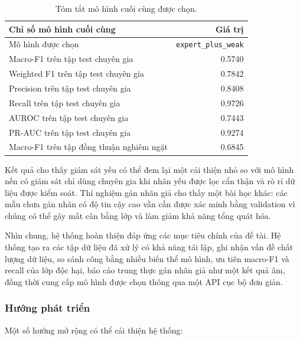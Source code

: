 \begin{table}[H]
\centering
\small
\renewcommand{\arraystretch}{1.25}
\begin{tabular}{|l|r|}
\hline
\textbf{Chỉ số mô hình cuối cùng} & \textbf{Giá trị} \\
\hline
Mô hình được chọn & \texttt{expert\_plus\_weak} \\
\hline
Macro-F1 trên tập test chuyên gia & 0.5740 \\
\hline
Weighted F1 trên tập test chuyên gia & 0.7842 \\
\hline
Precision trên tập test chuyên gia & 0.8408 \\
\hline
Recall trên tập test chuyên gia & 0.9726 \\
\hline
AUROC trên tập test chuyên gia & 0.7443 \\
\hline
PR-AUC trên tập test chuyên gia & 0.9274 \\
\hline
Macro-F1 trên tập đồng thuận nghiêm ngặt & 0.6845 \\
\hline
\end{tabular}
\caption{Tóm tắt mô hình cuối cùng được chọn.}
\label{tab:summary-final-model}
\end{table}

Kết quả cho thấy giám sát yếu có thể đem lại một cải thiện nhỏ so với mô hình nền có giám sát chỉ dùng chuyên gia khi nhãn yếu được lọc cẩn thận và rò rỉ dữ liệu được kiểm soát. Thí nghiệm gán nhãn giả cho thấy một bài học khác: các mẫu chưa gán nhãn có độ tin cậy cao vẫn cần được xác minh bằng validation vì chúng có thể gây mất cân bằng lớp và làm giảm khả năng tổng quát hóa.

Nhìn chung, hệ thống hoàn thiện đáp ứng các mục tiêu chính của đề tài. Hệ thống tạo ra các tập dữ liệu đã xử lý có khả năng tái lập, ghi nhận vấn đề chất lượng dữ liệu, so sánh công bằng nhiều biến thể mô hình, ưu tiên macro-F1 và recall của lớp độc hại, báo cáo trung thực gán nhãn giả như một kết quả âm, đồng thời cung cấp mô hình được chọn thông qua một API cục bộ đơn giản.

\subsubsection{Hướng phát triển}

Một số hướng mở rộng có thể cải thiện hệ thống:

